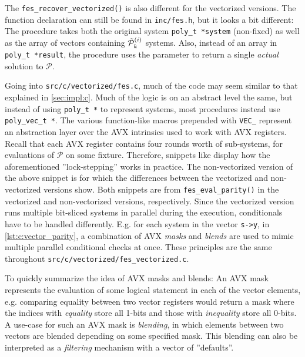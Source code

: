 The \texttt{fes\_recover\_vectorized()} is also different for the vectorized versions. The function declaration can still be found in \texttt{inc/fes.h}, but it looks a bit different:
The procedure takes both the original system \texttt{poly\_t *system} (non-fixed) as well as the array of vectors containing $\Tilde{\mathcal{P}}^{(i)}_k$ systems. Also, instead of an array in \texttt{poly\_t *result}, the procedure uses the parameter to return a single \textit{actual} solution to $\mathcal{P}$.

Going into \texttt{src/c/vectorized/fes.c}, much of the code may seem similar to that explained in \cref{sec:impl:c}. Much of the logic is on an abstract level the same, but instead of using \texttt{poly\_t *} to represent systems, most procedures instead use \texttt{poly\_vec\_t *}. The various function-like macros prepended with \texttt{VEC\_} represent an abstraction layer over the AVX intrinsics used to work with AVX registers. Recall that each AVX register contains four rounds worth of sub-systems, for evaluations of $\mathcal{P}$ on some fixture. Therefore, snippets like 
display how the aforementioned ''lock-stepping'' works in practice. The non-vectorized version of the above snippet is
for which the differences between the vectorized and non-vectorized versions show. Both snippets are from \texttt{fes\_eval\_parity()} in the vectorized and non-vectorized versions, respectively. Since the vectorized version runs multiple bit-sliced systems in parallel during the execution, conditionals have to be handled differently. E.g. for each system in the vector \texttt{s->y}, in \cref{lst:c:vector_parity}, a combination of AVX \textit{masks} and \textit{blends} are used to mimic multiple parallel conditional checks at once. These principles are the same throughout \texttt{src/c/vectorized/fes\_vectorized.c}.

To quickly summarize the idea of AVX masks and blends: An AVX mask represents the evaluation of some logical statement in each of the vector elements, e.g. comparing equality between two vector registers would return a mask where the indices with \textit{equality} store all 1-bits and those with \textit{inequality} store all 0-bits. A use-case for such an AVX mask is \textit{blending}, in which elements between two vectors are blended depending on some specified mask. This blending can also be interpreted as a \textit{filtering} mechanism with a vector of ''defaults''.

